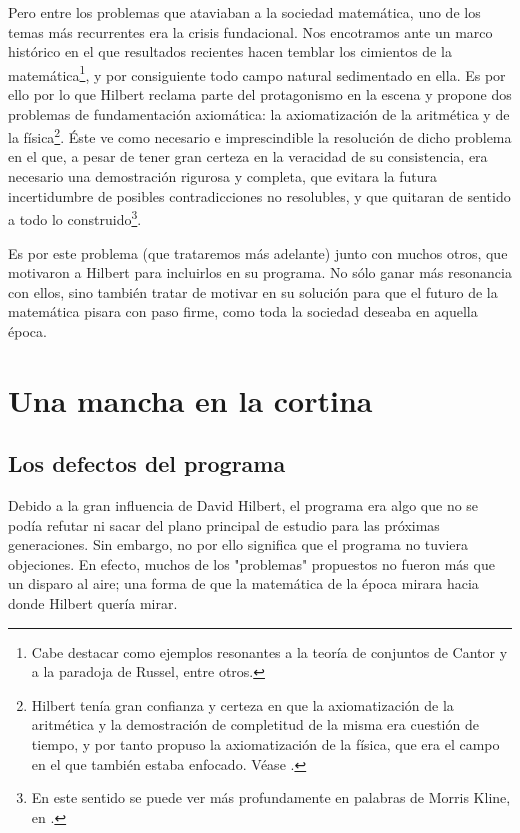 Pero entre los problemas que ataviaban a la sociedad matemática, uno de los temas más recurrentes era la crisis fundacional. Nos encotramos ante un marco histórico 
en el que resultados recientes hacen temblar los cimientos de la matemática\footnote{Cabe destacar como ejemplos resonantes a la teoría de conjuntos de Cantor y a la paradoja 
de Russel, entre otros.}, y por consiguiente todo campo natural sedimentado en ella. Es por ello por lo que Hilbert reclama parte del protagonismo en la escena y propone dos problemas
de fundamentación axiomática: la axiomatización de la aritmética y de la física\footnote{Hilbert tenía gran confianza y certeza en que la axiomatización de la aritmética y la demostración de 
completitud de la misma era cuestión de tiempo, y por tanto propuso la axiomatización de la física, que era el campo en el que también estaba enfocado. Véase \cite{kreisel1976have}.}.
Éste ve como necesario e imprescindible la resolución de dicho problema en el que, a pesar de tener gran certeza en la veracidad de su consistencia, era necesario una demostración rigurosa
y completa, que evitara la futura incertidumbre de posibles contradicciones no resolubles, y que quitaran de sentido a todo lo construido\footnote{En este sentido se puede ver más profundamente 
en palabras de Morris Kline, en \cite{kline2000matematicas}.}.

Es por este problema (que trataremos más adelante) junto con muchos otros, que motivaron a Hilbert para incluirlos en su programa. No sólo ganar más resonancia con ellos, sino 
también tratar de motivar en su solución para que el futuro de la matemática pisara con paso firme, como toda la sociedad deseaba en aquella época.

\chapter{Una mancha en la cortina} \label{ch:Hilbert-2}

\section{Los defectos del programa}

Debido a la gran influencia de David Hilbert, el programa era algo que no se podía refutar ni sacar del plano principal de estudio para las próximas generaciones. Sin embargo,
no por ello significa que el programa no tuviera objeciones. En efecto, muchos de los "problemas" propuestos no fueron más que un disparo al aire; una forma de que la matemática 
de la época mirara hacia donde Hilbert quería mirar. 


